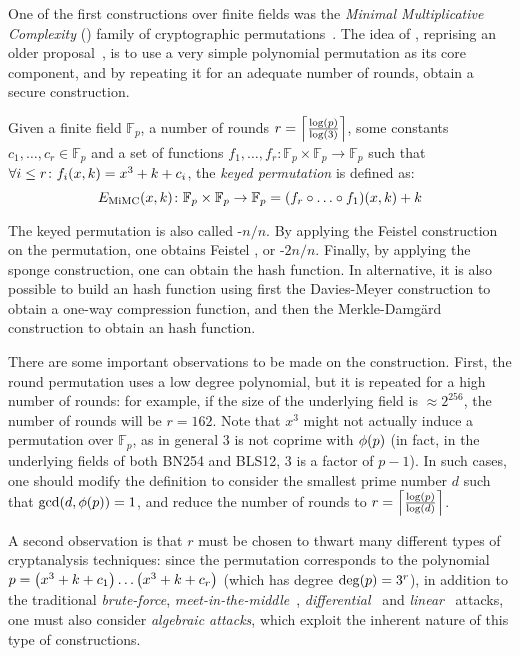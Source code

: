 One of the first constructions over finite fields was the \emph{Minimal Multiplicative Complexity}
(\Mimc) family of cryptographic permutations~\cite{AlbrechtGRRT2016}.
The idea of \Mimc{}, reprising an older proposal~\cite{NybergK1995}, is to use a very simple 
polynomial permutation as its core component, and by repeating it for an adequate number of rounds,
obtain a secure construction.
\begin{definition}
  Given a finite field \(\mathbb{F}_p\), a number of rounds 
  \(r = \Ceil*{\frac{\call{\log}{p}}{\call{\log}{3}}}\), some constants 
  \(c_1, \dots, c_r \in \mathbb{F}_p\) and a set of functions 
  \(f_1, \dots, f_r\colon \mathbb{F}_p \times \mathbb{F}_p \to \mathbb{F}_p\) such that 
  \(\forall i \le r\colon \call{f_i}{x, k} = x^3 + k + c_i\), the \emph{\Mimc{} keyed permutation}
  is defined as:
  \[
    \call{E_{\Mimc}}{x, k}\colon \mathbb{F}_p \times \mathbb{F}_p \to \mathbb{F}_p = 
    \call{\Parens*{f_r \compose \dots \compose f_1}}{x, k} + k
  \]
\end{definition}

The \Mimc{} keyed permutation is also called \Mimc-\(n/n\). 
By applying the Feistel construction on the \Mimc{} permutation, one obtains Feistel \Mimc, 
or \Mimc-\(2n/n\).
Finally, by applying the sponge construction, one can obtain the \Mimchash{} hash function.
In alternative, it is also possible to build an hash function using first the Davies-Meyer 
construction to obtain a one-way compression function, and then the Merkle-Damg\"{a}rd construction
to obtain an hash function.

There are some important observations to be made on the \Mimc{} construction.
First, the round permutation uses a low degree polynomial, but it is repeated for a high number of 
rounds: for example, if the size of the underlying field is \(\approx 2^{256}\), the number of 
rounds will be \(r = 162\). 
Note that \(x^3\) might not actually induce a permutation over \(\mathbb{F}_p\), as in general 
\(3\) is not coprime with \(\call{\totient}{p}\) (in fact, in the underlying fields of both BN254 
and BLS12, \(3\) is a factor of \(p - 1\)).
In such cases, one should modify the definition to consider the smallest prime number \(d\) such 
that \(\call{\gcd}{d, \call{\totient}{p}} = 1\), and reduce the number of rounds to
\(r = \Ceil*{\frac{\call{\log}{p}}{\call{\log}{d}}}\).

A second observation is that \(r\) must be chosen to thwart many different types of cryptanalysis 
techniques: since the \Mimc{} permutation corresponds to the 
polynomial \(p = \Parens*{x^3 + k + c_1}\dots\Parens*{x^3 + k + c_r}\) 
(which has degree \(\call{\deg}{p} = 3^r\)), in addition to the traditional \emph{brute-force}, 
\emph{meet-in-the-middle}~\cite{DiffieH1977}, \emph{differential}~\cite{BihamS1991} and 
\emph{linear}~\cite{Matsui1994} attacks, one must also consider \emph{algebraic attacks}, 
which exploit the inherent nature of this type of constructions.


